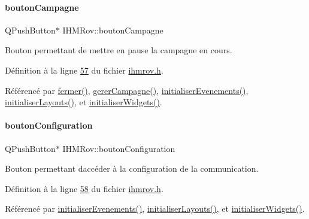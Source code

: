 \paragraph{\texorpdfstring{bouton\+Campagne}{boutonCampagne}}
{\footnotesize\ttfamily Q\+Push\+Button$\ast$ I\+H\+M\+Rov\+::bouton\+Campagne\hspace{0.3cm}{\ttfamily [private]}}



Bouton permettant de mettre en pause la campagne en cours. 



Définition à la ligne \hyperlink{ihmrov_8h_source_l00057}{57} du fichier \hyperlink{ihmrov_8h_source}{ihmrov.\+h}.



Référencé par \hyperlink{ihmrov_8cpp_source_l00253}{fermer()}, \hyperlink{ihmrov_8cpp_source_l00202}{gerer\+Campagne()}, \hyperlink{ihmrov_8cpp_source_l00098}{initialiser\+Evenements()}, \hyperlink{ihmrov_8cpp_source_l00061}{initialiser\+Layouts()}, et \hyperlink{ihmrov_8cpp_source_l00033}{initialiser\+Widgets()}.

\mbox{\label{class_i_h_m_rov_aea67721180bf155892a297b3c39309c5}} 
\paragraph{\texorpdfstring{bouton\+Configuration}{boutonConfiguration}}
{\footnotesize\ttfamily Q\+Push\+Button$\ast$ I\+H\+M\+Rov\+::bouton\+Configuration\hspace{0.3cm}{\ttfamily [private]}}



Bouton permettant d\textquotesingle{}accéder à la configuration de la communication. 



Définition à la ligne \hyperlink{ihmrov_8h_source_l00058}{58} du fichier \hyperlink{ihmrov_8h_source}{ihmrov.\+h}.



Référencé par \hyperlink{ihmrov_8cpp_source_l00098}{initialiser\+Evenements()}, \hyperlink{ihmrov_8cpp_source_l00061}{initialiser\+Layouts()}, et \hyperlink{ihmrov_8cpp_source_l00033}{initialiser\+Widgets()}.

\mbox{\label{class_i_h_m_rov_a57cb3bea4f1f9149d730ccc5688581fc}} 
